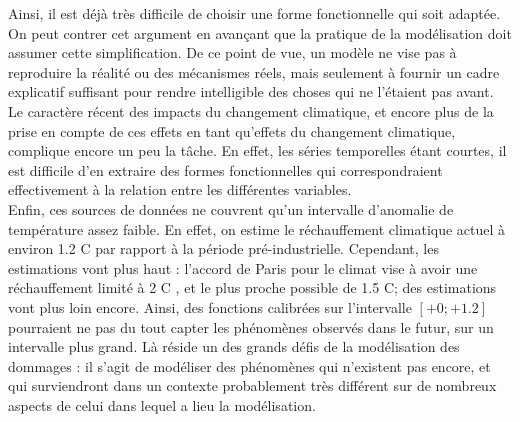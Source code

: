 Ainsi, il est déjà très difficile de choisir une forme fonctionnelle qui soit adaptée. On peut contrer cet argument en avançant que la pratique de la modélisation doit assumer cette simplification. De ce point de vue, un modèle ne vise pas à reproduire la réalité ou des mécanismes réels, mais seulement à fournir un cadre explicatif suffisant pour rendre intelligible des choses qui ne l'étaient pas avant. \\

Le caractère récent des impacts du changement climatique, et encore plus de la prise en compte de ces effets en tant qu'effets du changement climatique, complique encore un peu la tâche. En effet, les séries temporelles étant courtes, il est difficile d'en extraire des formes fonctionnelles qui correspondraient effectivement à la relation entre les différentes variables. \\

Enfin, ces sources de données ne couvrent qu'un intervalle d'anomalie de température assez faible. En effet, on estime le réchauffement climatique actuel à environ 1.2 \textdegree C par rapport à la période pré-industrielle. Cependant, les estimations vont plus haut : l'accord de Paris pour le climat vise à avoir une réchauffement limité à 2 \textdegree C , et le plus proche possible de 1.5 \textdegree C; des estimations vont plus loin encore. Ainsi, des fonctions calibrées sur l'intervalle $[+0; +1.2]$ pourraient ne pas du tout capter les phénomènes observés dans le futur, sur un intervalle plus grand. Là réside un des grands défis de la modélisation des dommages : il s'agit de modéliser des phénomènes qui n'existent pas encore, et qui surviendront dans un contexte probablement très différent sur de nombreux aspects de celui dans lequel a lieu la modélisation. 



